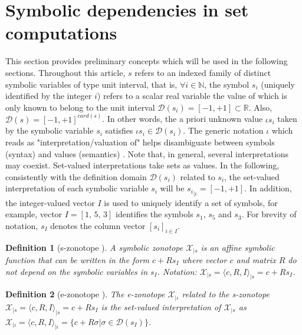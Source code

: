 \documentclass[journal]{IEEEtran}
\newtheorem{mydefinition}{Definition}
\begin{document}
 

\section{Symbolic dependencies in set computations} \label{sec:preliminaries}

This section provides preliminary concepts which will be used in the following sections. Throughout this article, $s$ refers to an indexed family of distinct symbolic variables of type unit interval, that is, $\forall i \in \mathbb{N}$, the symbol $s_i$ (uniquely identified by the integer $i$) refers to a scalar real variable the value of which is only known to belong to the unit interval $\mathcal{D}(s_i)=[-1,+1] \subset \mathbb{R}$. Also, $\mathcal{D}(s)=[-1,+1]^{card(s)}$. In other words, the a priori unknown value $\iota s_i$ taken by the symbolic variable $s_i$ satisfies $\iota s_i \in \mathcal{D}(s_i)$. The generic notation $\iota$ which reads as "interpretation/valuation of" helps disambiguate between symbols (syntax) and values (semantics) \cite{combastel2020functional}. Note that, in general, several interpretations may coexist. Set-valued interpretations take sets as values. In the following, consistently with the definition domain $\mathcal{D}(s_i)$ related to $s_i$, the set-valued interpretation of each symbolic variable $s_i$ will be ${s_i}_{|\iota} = [-1,+1]$. In addition,  the integer-valued vector $I$ is used to uniquely identify a set of symbols, for example,  vector $I = [1, \,5, \, 3]$ identifies the symbols $s_1$, $s_5$ and $s_3$. For brevity of notation, $s_I$ denotes the column vector $[s_i]_{i\in I}$.

\begin{mydefinition}[s-zonotope \cite{combastel2020functional}] \label{def:s-zonotope}
A symbolic zonotope $\mathcal{X}_{|s}$ is an affine symbolic function that can be written in the form $c + Rs_I$ where vector $c$ and matrix $R$ do not depend on the symbolic variables in $s_I$. Notation: $\mathcal{X}_{|s} = \langle c,R,I\rangle _{|s} = c + R s_I$.
\end{mydefinition}

\begin{mydefinition}[e-zonotope \cite{combastel2020functional}] \label{def:s-zonotope}
The e-zonotope $\mathcal{X}_{|\iota}$ related to the s-zonotope $\mathcal{X}_{|s} = \langle c,R,I\rangle_{|s} = c + R s_I$ is the set-valued interpretation of $\mathcal{X}_{|s}$ as $\mathcal{X}_{|\iota} = \langle c,R,I\rangle _{|\iota} = \{c + R \sigma | \sigma \in \mathcal{D}(s_I)\}$. 
\end{mydefinition}
\end{document}
